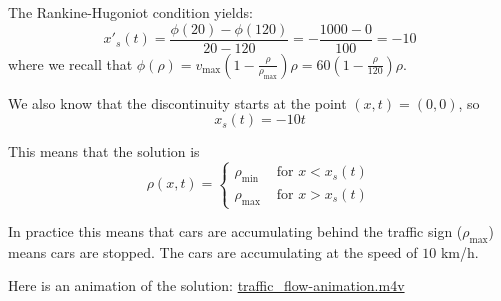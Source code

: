 \documentclass{workbook}
\begin{document}
\begin{solution}
\begin{slide}

\begin{parts}

\item The Rankine-Hugoniot condition yields:
\[
x'_s(t) = \frac{\phi(20) - \phi(120)}{20-120} = -\frac{1000 - 0}{100} = -10
\]
where we recall that $\displaystyle\phi(\rho) = v_{\max} \left( 1 - \frac{\rho}{\rho_{\max}}\right) \rho = 60 \left(1 - \frac{\rho}{120}\right) \rho$.

We also know that the discontinuity starts at the point $(x,t) = (0,0)$, so 
\[
x_s(t) = -10t
\]

\begin{minipage}{.5\textwidth}
This means that the solution is
\[
\rho(x,t) = 
	\begin{cases}
		\rho_{\min} & \text{ for } x < x_s(t) \\
		\rho_{\max} & \text{ for } x > x_s(t)
	\end{cases}
\]

In practice this means that cars are accumulating behind the traffic sign ($\rho_{\max}$) means cars are stopped.
The cars are accumulating at the speed of $10$ km/h.
\end{minipage}
\hfill
\begin{minipage}{.4\textwidth}
\end{minipage}

Here is an animation of the solution: \href{https://raw.githubusercontent.com/bigfatbernie/IBLMathModeling/main/book/images/traffic_flow-animation.m4v}{traffic_flow-animation.m4v}

\end{parts}
	
\end{slide}	
\end{solution}
\end{document}

